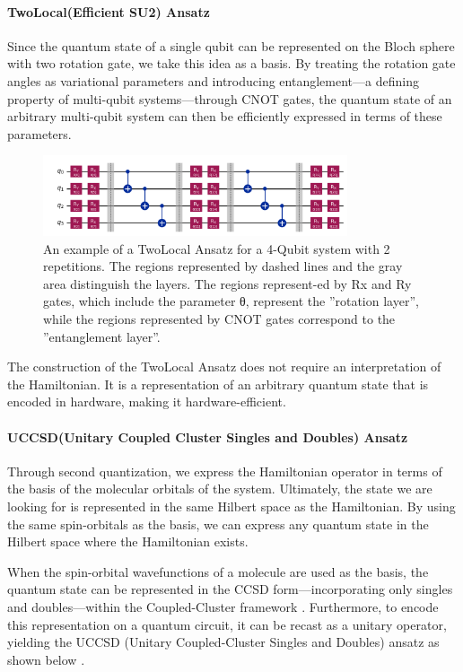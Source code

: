 \documentclass[pdflatex,sn-mathphys-num]{sn-jnl}%
\theoremstyle{thmstyleone}%
\theoremstyle{thmstyletwo}%
\theoremstyle{thmstylethree}%
\begin{document}
\paragraph{TwoLocal(Efficient SU2) Ansatz} \leavevmode \newline
Since the quantum state of a single qubit can be represented on the Bloch sphere with two rotation gate, we take this idea as a basis. 
By treating the rotation gate angles as variational parameters and introducing entanglement—a defining property of multi-qubit systems—through CNOT gates, 
the quantum state of an arbitrary multi-qubit system can then be efficiently expressed in terms of these parameters\cite{TL1,TL2}.

\begin{figure}[htbp]
\centering
\includegraphics[width=0.8\textwidth]{fig/twolocal.png}
\caption{An example of a TwoLocal Ansatz for a 4-Qubit system with 2 repetitions. The regions represented by dashed lines and the gray area distinguish the layers. The regions represent-ed by Rx and Ry gates, which include the parameter θ, represent the ''rotation layer'', while the regions represented by CNOT gates correspond to the ''entanglement layer''.}\label{Fig.3}
\end{figure}
The construction of the TwoLocal Ansatz does not require an interpretation of the Hamiltonian. It is a representation of an arbitrary quantum state that is encoded in hardware, making it hardware-efficient.

\paragraph{UCCSD(Unitary Coupled Cluster Singles and Doubles) Ansatz} \leavevmode \newline
Through second quantization, we express the Hamiltonian operator in terms of the basis of the molecular orbitals of the system. 
Ultimately, the state we are looking for is represented in the same Hilbert space as the Hamiltonian. By using the same spin-orbitals as the basis, 
we can express any quantum state in the Hilbert space where the Hamiltonian exists. 

When the spin-orbital wavefunctions of a molecule are used as the basis, the quantum state can be represented in the CCSD form—incorporating only singles and doubles—within the Coupled-Cluster framework \cite{CC1,CC2}. Furthermore, to encode this representation on a quantum circuit, it can be recast as a unitary operator, yielding the UCCSD (Unitary Coupled-Cluster Singles and Doubles) ansatz as shown below \cite{UCC1,UCC2}.
\end{document}
